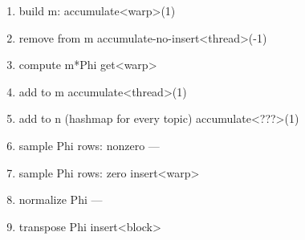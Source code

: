 \documentclass{article}
\begin{document}
\begin{enumerate}
\item build m: 				accumulate<warp>(1)
\item remove from m			accumulate-no-insert<thread>(-1)
\item compute m*Phi			get<warp>
\item add to m				accumulate<thread>(1)
\item add to n (hashmap for every topic)	accumulate<???>(1)
\item sample Phi rows: nonzero		---
\item sample Phi rows: zero		insert<warp>
\item normalize Phi			---
\item transpose Phi			insert<block>
\end{enumerate}
\end{document}
